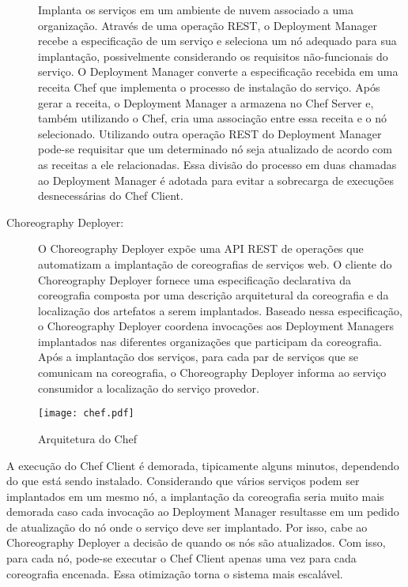 \begin{description}
Implanta os serviços em um ambiente de nuvem associado a uma organização. Através de uma operação REST, o Deployment Manager recebe a especificação de um serviço e seleciona um nó adequado para sua implantação, possivelmente considerando os requisitos não-funcionais do serviço. O Deployment Manager converte a especificação recebida em uma receita Chef que implementa o processo de instalação do serviço. Após gerar a receita, o Deployment Manager a armazena no Chef Server e, também utilizando o Chef, cria uma associação entre essa receita e o nó selecionado. Utilizando outra operação REST do Deployment Manager pode-se requisitar que um determinado nó seja atualizado de acordo com as receitas a ele relacionadas. Essa divisão do processo em duas chamadas ao Deployment Manager é adotada para evitar a sobrecarga de execuções desnecessárias do Chef Client.

\item [Choreography Deployer:]

O Choreography Deployer expõe uma API REST de operações que automatizam a implantação de coreografias de serviços web. O cliente do Choreography Deployer fornece uma especificação declarativa da coreografia composta por uma descrição arquitetural da coreografia e da localização dos artefatos a serem implantados. Baseado nessa especificação, o Choreography Deployer coordena invocações aos Deployment Managers implantados nas diferentes organizações que participam da coreografia. Após a implantação dos serviços, para cada par de serviços que se comunicam na coreografia, o Choreography Deployer informa ao serviço consumidor a localização do serviço provedor.

\end{description}

\begin{figure}[!h]
  \centering
  \texttt{[image: chef.pdf]} 
  \caption{Arquitetura do Chef}
  \label{fig:chef_arquitetura} 
\end{figure}

A execução do Chef Client é demorada, tipicamente alguns minutos, dependendo do que está sendo instalado. Considerando que vários serviços podem ser implantados em um mesmo nó, a implantação da coreografia seria muito mais demorada caso cada invocação ao Deployment Manager resultasse em um pedido de atualização do nó onde o serviço deve ser implantado. Por isso, cabe ao Choreography Deployer a decisão de quando os nós são atualizados. Com isso, para cada nó, pode-se executar o Chef Client apenas uma vez para cada coreografia encenada. Essa otimização torna o sistema mais escalável. 

